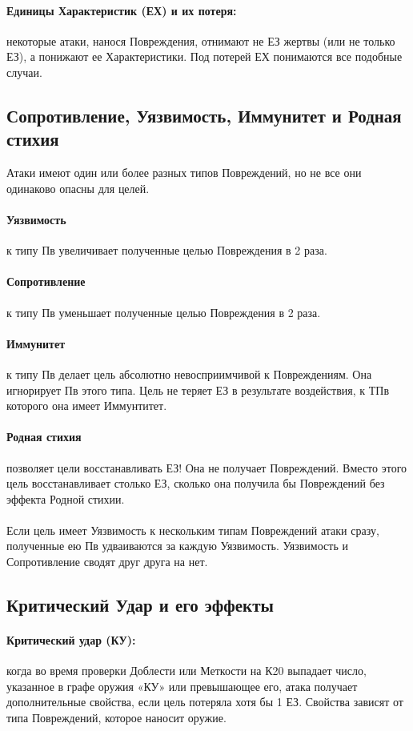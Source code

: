 \paragraph{Единицы Характеристик (ЕХ) и их потеря:} некоторые атаки, нанося Повреждения, отнимают не ЕЗ жертвы (или не только ЕЗ), а понижают ее Характеристики. Под потерей ЕХ понимаются все подобные случаи. 

\subsection{Сопротивление, Уязвимость, Иммунитет и Родная стихия}
Атаки имеют один или более разных типов Повреждений, но не все они одинаково опасны для целей.
\paragraph{Уязвимость} к типу Пв увеличивает полученные целью Повреждения в 2 раза. 
\paragraph{Сопротивление} к типу Пв уменьшает полученные целью Повреждения в 2 раза. 
\paragraph{Иммунитет} к типу Пв делает цель абсолютно невосприимчивой к Повреждениям. Она игнорирует Пв этого типа. Цель не теряет ЕЗ в результате воздействия, к ТПв которого она имеет Иммунтитет.
\paragraph{Родная стихия} позволяет цели восстанавливать ЕЗ! Она не получает Повреждений. Вместо этого цель восстанавливает столько ЕЗ, сколько она получила бы Повреждений без эффекта Родной стихии.
\paragraph{}Если цель имеет Уязвимость к нескольким типам Повреждений атаки сразу, полученные ею Пв удваиваются за каждую Уязвимость. 
\newline Уязвимость и Сопротивление сводят друг друга на нет. 

\subsection{Критический Удар и его эффекты}
\paragraph{Критический удар (КУ):} когда во время проверки Доблести или Меткости на К20 выпадает число, указанное в графе оружия «КУ» или превышающее его, атака получает дополнительные свойства, если цель потеряла хотя бы 1 ЕЗ. Свойства зависят от типа Повреждений, которое наносит оружие.
